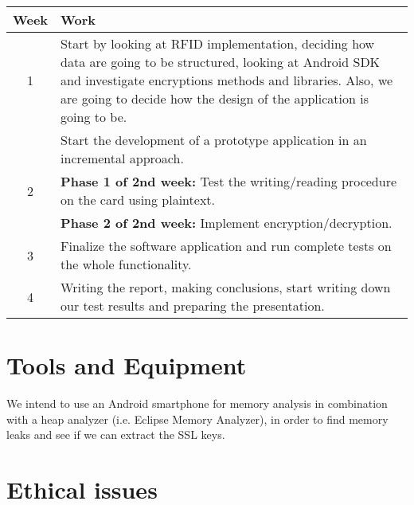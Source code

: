 \documentclass[11pt]{article}
\begin{document}
\begin{center}
\begin{tabular}{ | c | m{11cm}|  } 
\hline
Week & Work \\ 
\hline
1 & Start by looking at RFID implementation, deciding how data are going to be structured, looking at Android SDK and investigate encryptions methods and libraries. Also, we are going to decide how the design of the application is going to be. \\ 
\hline
& Start the development of a prototype application in an incremental approach.\\
2 & \textbf{Phase 1 of 2nd week:} Test the writing/reading procedure on the card using plaintext.\\
& \textbf{Phase 2 of 2nd week:} Implement encryption/decryption.\\ 
\hline
3 & Finalize the software application and run complete tests on the whole functionality.\\ 
\hline
4 & Writing the report, making conclusions, start writing down our test results and preparing the presentation. \\
\hline
\end{tabular}
\end{center}

\clearpage

\section{Tools and Equipment}
We intend to use an Android smartphone for memory analysis in combination with a heap analyzer (i.e. Eclipse Memory Analyzer), in order to find memory leaks and see if we can extract the SSL keys. 

\section{Ethical issues}




\end{document}

